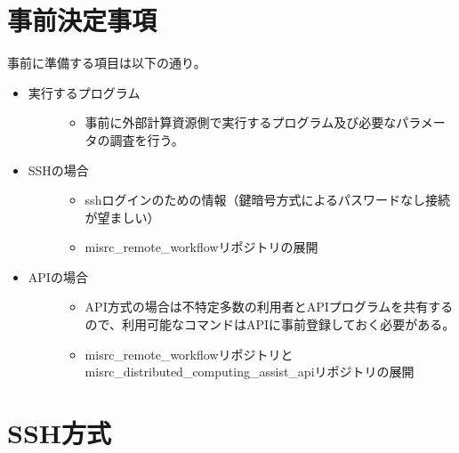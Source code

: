 \documentclass[letterpaper,10pt,dvipdfmx,openany]{sphinxmanual}
\begin{document}
\section{事前決定事項}
\label{\detokenize{using_distributed_properties:id25}}
事前に準備する項目は以下の通り。
\begin{itemize}
\item {} \begin{description}
\item[{実行するプログラム}] \leavevmode\begin{itemize}
\item {} 
事前に外部計算資源側で実行するプログラム及び必要なパラメータの調査を行う。

\end{itemize}

\end{description}

\item {} \begin{description}
\item[{SSHの場合}] \leavevmode\begin{itemize}
\item {} 
sshログインのための情報（鍵暗号方式によるパスワードなし接続が望ましい）

\item {} 
misrc\_remote\_workflowリポジトリの展開

\end{itemize}

\end{description}

\item {} \begin{description}
\item[{APIの場合}] \leavevmode\begin{itemize}
\item {} 
API方式の場合は不特定多数の利用者とAPIプログラムを共有するので、利用可能なコマンドはAPIに事前登録しておく必要がある。

\item {} 
misrc\_remote\_workflowリポジトリとmisrc\_distributed\_computing\_assist\_apiリポジトリの展開

\end{itemize}

\end{description}

\end{itemize}


\section{SSH方式}
\label{\detokenize{using_distributed_properties:id26}}
\end{document}
